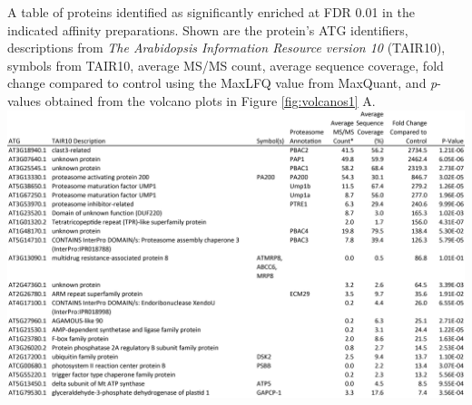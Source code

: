 \begin{table}
	{A table of proteins identified as significantly enriched at FDR 0.01 in the indicated affinity preparations.  Shown are the protein's ATG identifiers, descriptions from \textit{The Arabidopsis Information Resource version 10} (TAIR10), symbols from TAIR10, average MS/MS count, average sequence coverage, fold change compared to control using the MaxLFQ value from MaxQuant, and \textit{p}-values obtained from the volcano plots in Figure \ref{fig:volcanos1} A.}
\includegraphics[width=\linewidth]{Proteasome/pag1minus.png}
\label{table:pag1minus}
\end{table}
\clearpage


